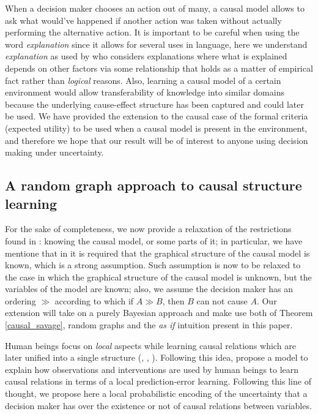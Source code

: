 \documentclass[review]{elsarticle}
\begin{document}
When a decision maker chooses an action out of many, a causal model allows to ask what would've happened if another action was taken without actually performing the alternative action. It is important to be careful when using the word \textit{explanation} since it allows for several uses in language, here we understand \textit{explanation} as used by \cite{woodward2005making} who considers explanations where what is explained depends on other factors via some relationship that holds as a matter of empirical fact rather than \textit{logical} reasons. Also, learning a causal model of a certain environment would allow transferability of knowledge into similar domains because the underlying cause-effect structure has been captured and could later be used. We have provided the extension to the causal case of the formal criteria (expected utility) to be used when a causal model is present in the environment, and therefore we hope that our result will be of interest to anyone using decision making under uncertainty. 

\subsection{A random graph approach to causal structure learning}
\label{random_graphs}
For the sake of completeness, we now provide a relaxation of the restrictions found in \cite{lattimoreNIPS2016,sen2017identifying,gonzalez2018playing}: knowing the causal model, or some parts of it; in particular, we have mentione that in \cite{gonzalez2018playing} it is required that the graphical structure of the causal model is known, which is a strong assumption. Such assumption is now to be relaxed to the case in which the graphical structure of the causal model is unknown, but the variables of the model are known; also, we assume the decision maker has an ordering $\gg$ according to which if $A \gg B$, then $B$ can not cause $A$. Our extension will take on a purely Bayesian approach and make use both of Theorem \ref{causal_savage}, random graphs and the \textit{as if} intuition present in this paper.

Human beings focus on \textit{local} aspects while learning causal relations which are later unified into a single structure (\cite{fernbach2009causal}, \cite{waldmann2008causal},  \cite{danks2014unifying}). Following this idea, \cite{wellen2012learning} propose a model to explain how observations  and interventions are used by human beings to learn causal relations in terms of a local prediction-error learning. Following this line of thought, we propose here a local probabilistic encoding of the uncertainty that a decision maker has over the existence or not of causal relations between variables.
\end{document}
